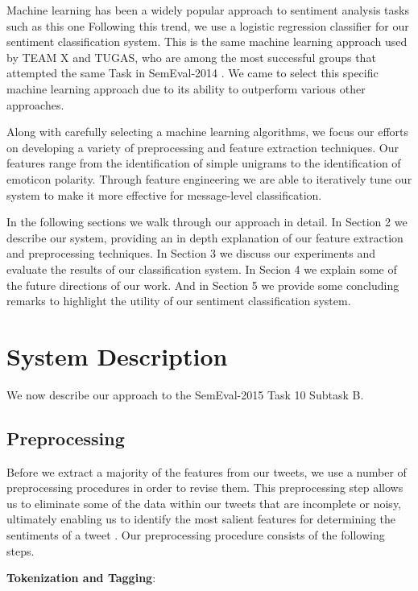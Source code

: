 \documentclass[11pt,letterpaper]{article}
\begin{document}
Machine learning has been a widely popular approach to sentiment analysis tasks such as this one \cite{Denis:2014:SemEval} Following this trend, we use a logistic regression classifier for our sentiment classification system. This is the same machine learning approach used by TEAM X and TUGAS, who are among the most successful groups that attempted the same Task in SemEval-2014 \cite{Amir:2014:SemEval,Miura:2014:SemEval}. We came to select this specific machine learning approach due to its ability to outperform various other approaches. 

Along with carefully selecting a machine learning algorithms, we focus our efforts on developing a variety of preprocessing and feature extraction techniques. Our features range from the identification of simple unigrams to the identification of emoticon polarity. Through feature engineering we are able to iteratively tune our system to make it more effective for message-level classification.

In the following sections we walk through our approach in detail. In Section 2 we describe our system, providing an in depth explanation of our feature extraction and preprocessing techniques. In Section 3 we discuss our experiments and evaluate the results of our classification system. In Secion 4 we explain some of the future directions of our work. And in Section 5 we provide some concluding remarks to highlight the utility of our sentiment classification system.

\section{System Description}
We now describe our approach to the SemEval-2015 Task 10 Subtask B. 

\subsection{Preprocessing}
\label{sect:ptrprocessing}

Before we extract a majority of the features from our tweets, we use a number of preprocessing procedures in order to revise them. This preprocessing step allows us to eliminate some of the data within our tweets that are incomplete or noisy, ultimately enabling us to identify the most salient features for determining the sentiments of a tweet \cite{Hemalatha:12}. Our preprocessing procedure consists of the following steps.

\vspace{3 mm}
\noindent
{\bf Tokenization and Tagging}:
\end{document}
